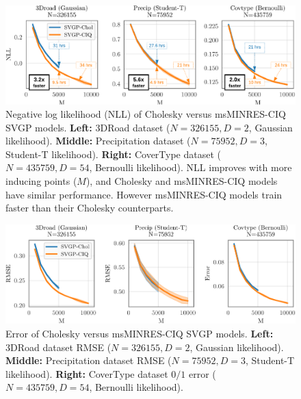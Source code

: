 \begin{figure}[t!]
  \centering
  \includegraphics[width=\linewidth]{figures/variational_nll.pdf}
  \caption[Negative log likelihood (NLL) of Cholesky versus msMINRES-CIQ SVGP models.]{
    Negative log likelihood (NLL) of Cholesky versus msMINRES-CIQ SVGP models.
    {\bf Left:} 3DRoad dataset ($N=326155, D=2$, Gaussian likelihood).
    {\bf Middle:} Precipitation dataset ($N=75952, D=3$, Student-T likelihood).
    {\bf Right:} CoverType dataset ($N=435759, D=54$, Bernoulli likelihood).
    NLL improves with more inducing points ($M$), and Cholesky and msMINRES-CIQ models have similar performance.
    However msMINRES-CIQ models train faster than their Cholesky counterparts.
  }
  \label{fig:variational_nll}
\end{figure}

\begin{figure}[t!]
  \centering
  \includegraphics[width=\linewidth]{figures/variational_error.pdf}
  \caption[Error of Cholesky versus msMINRES-CIQ SVGP models.]{
    Error of Cholesky versus msMINRES-CIQ SVGP models.
    {\bf Left:} 3DRoad dataset RMSE ($N=326155, D=2$, Gaussian likelihood).
    {\bf Middle:} Precipitation dataset RMSE ($N=75952, D=3$, Student-T likelihood).
    {\bf Right:} CoverType dataset $0/1$ error ($N=435759, D=54$, Bernoulli likelihood).
  }
  \label{fig:variational_error}
\end{figure}

